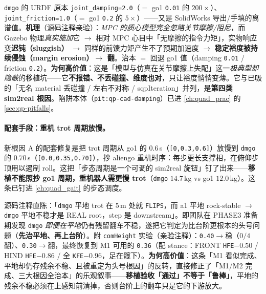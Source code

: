 \begin{insight}\label{ins:qadv-friction-margin}
\texttt{dmgo} 的 URDF 原本 \texttt{joint\_damping=2.0}（$=$ go1 \texttt{0.01} 的 \textbf{$200\times$}）、\texttt{joint\_friction=1.0}（$=$ go1 \texttt{0.2} 的 \textbf{$5\times$}）——又是 SolidWorks 导出/手填的离谱值。\textbf{机理}（源码注释亲验）：\emph{MPC 的质心模型完全忽略关节摩擦/阻尼}，而 Gazebo 物理\emph{真实施加}它 $\to$ 相对 MPC 心目中「无摩擦的指令力矩」，实物响应变\textbf{迟钝（sluggish）} $\to$ 同样的前馈力矩产生不了预期加速度 $\to$ \textbf{稳定裕度被持续侵蚀（margin erosion）$\to$ 翻}。治本 $=$ 回退 go1 值（damping \texttt{0.01} / friction \texttt{0.2}）。\textbf{为何高价值}：这是「模型与仿真在关节摩擦上失配」这一\emph{极典型却隐蔽}的移植坑——它\textbf{不报错、不丢碰撞、维度也对}，只让裕度悄悄变薄。它与已吸的「无名 material 丢碰撞 / 左右不对称 / sqpIteration」并列，是\textbf{第四类 sim2real 根因}。陷阱本体（\texttt{pit:qp-cad-damping}）已进 \cref{ch:quad_prac} 的 \cref{sec:qp-pitfalls}。
\end{insight}

\paragraph{配套手段：重机 trot 周期放慢。}
新根因 A 的配套修复是把 trot 周期从 go1 的 $0.6$\,s（\texttt{[0,0.3,0.6]}）放慢到 \texttt{dmgo} 的 $0.70$\,s（\texttt{[0.0,0.35,0.70]}），抄 aliengo 重机时序：每步更长支撑相，在俯仰步顶用以遏制 roll。这把「步态周期是一个可调的 sim2real 旋钮」钉了出来——\textbf{移植不能照抄 go1 周期，重机器人需更慢 trot}（\texttt{dmgo} $14.7$\,kg vs go1 $12.0$\,kg）。这条已钉进 \cref{ch:quad_gait} 的步态调度。

\begin{insight}\label{ins:qadv-flat-root}
源码注释直陈：「\texttt{dmgo} 平地 trot 在 $5$\,m 处就 \texttt{FLIPS}，而 a1 平地 rock-stable $\to$ \texttt{dmgo} 平地不稳才是 REAL root，step 是 downstream」。即团队在 PHASE3 准备期发现 \texttt{dmgo} \emph{即便在平地}仍有残留翻车不稳，遂把它判定为比台阶更根本的头号问题（\textbf{先治平地、再上台阶}）。附 \texttt{comHeight} 实验（亲验注释）：\texttt{0.40}$\to$稳（$0/4$ 翻）、\texttt{0.30}$\to$翻，最终恢复到 M1 可用的 \texttt{0.36}（配 stance：FRONT \texttt{HFE}$-0.50$ / HIND \texttt{HFE}$-0.86$ / 全 \texttt{KFE}$-0.96$，足在髋下）。\textbf{为何高价值}：这条「M1 看似完成、平地却仍存残余不稳、且被重定为头号根因」的反转，直接修正了「M1/M2 完成、三大根因全治本」的乐观叙事——\textbf{移植验收「通过」不等于「鲁棒」}，平地的残余不稳必须在上感知前清掉，否则台阶上的翻车只是它的下游放大。
\end{insight}

